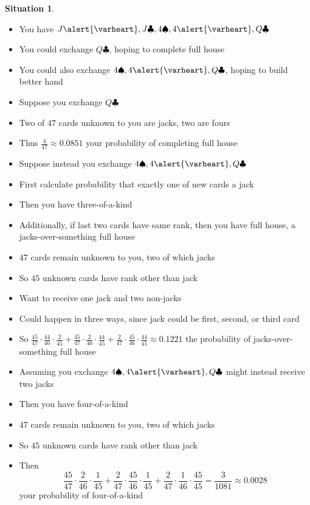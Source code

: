 \documentclass[xcolor=dvipsnames]{beamer}
\theoremstyle{definition}
\newtheorem{situation}{Situation}
\newcommand{\hs}{\alert{\varheart}}
\newcommand{\s}{\spadesuit}
\newcommand{\cs}{\clubsuit}
\begin{document}
\begin{frame}
\begin{situation}
\begin{itemize}
\item You have $J\hs,J\cs,4\s,4\hs,Q\cs$
\item You could exchange $Q\cs$, hoping to complete full house
\item You could also exchange $4\s,4\hs,Q\cs$, hoping to build better hand
\end{itemize}
\end{situation}
\begin{itemize}
\item Suppose you exchange $Q\cs$
\item Two of $47$ cards unknown to you are jacks, two are fours
\item Thus $\frac{4}{47}\approx 0.0851$ your probability
of completing full house
\end{itemize}
\end{frame}

\begin{frame}
\begin{itemize}
\item Suppose instead you exchange $4\s,4\hs,Q\cs$
\item First calculate probability that exactly one of new cards
a jack
\item Then you have three-of-a-kind
\item Additionally, if last two cards have same rank,
then you have full house, a \alert{jacks-over-something full house}
\item $47$ cards remain unknown to you, two of which jacks
\item So $45$ unknown cards have rank other than jack
\item Want to receive one jack and two non-jacks
\item Could happen in three ways, since jack could be
first, second, or third card
\item So $\frac{45}{47}\cdot\frac{44}{46}\cdot\frac{2}{45}
+\frac{45}{47}\cdot\frac{2}{46}\cdot\frac{44}{45}
+\frac{2}{47}\cdot\frac{45}{46}\cdot\frac{44}{45}\approx 0.1221$
the probability of jacks-over-something full house
\end{itemize}
\end{frame}

\begin{frame}
\begin{itemize}
\item Assuming you exchange $4\s,4\hs,Q\cs$
might instead receive \alert{two} jacks
\item Then you have four-of-a-kind
\item $47$ cards remain unknown to you, two of which jacks
\item So $45$ unknown cards have rank other than jack
\item Then \[\frac{45}{47}\cdot\frac{2}{46}\cdot\frac{1}{45}
+\frac{2}{47}\cdot\frac{45}{46}\cdot\frac{1}{45}
+\frac{2}{47}\cdot\frac{1}{46}\cdot\frac{45}{45}
=\frac{3}{1081}\approx 0.0028\]
your probability of four-of-a-kind
\end{itemize}
\end{frame}
\end{document}

